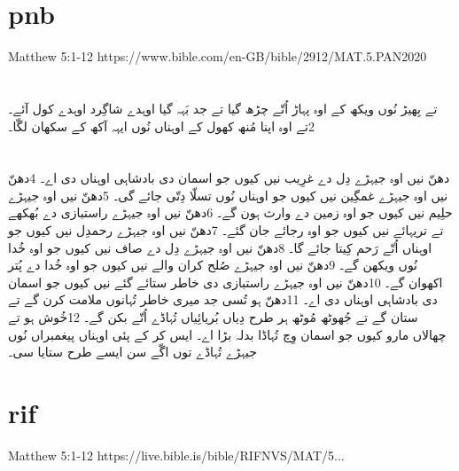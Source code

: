 \documentclass[12pt,fleqn,titlepage,twoside,a4paper]{book}
\begin{document}
\section{pnb}

Matthew 5:1-12 https://www.bible.com/en-GB/bible/2912/MAT.5.PAN2020

\begin{arab}[utf]
\section*{}

تے بِھیڑ نُوں ویکھ کے اوہ پہاڑ اُتّے چڑھ گیا تے جد بَہہ گیا اوہدے شاگِرد اوہدے کول آئے۔ 2تے اوہ اپنا مُنھ کھول کے اوہناں نُوں ایہہ آکھ کے سکھان لگّا۔

\section*{}

دھنّ نیں اوہ جیہڑے دِل دے غرِیب نیں
کیوں جو اسمان دی بادشاہی اوہناں دی اے۔
4دھنّ نیں اوہ جیہڑے غمگِین نیں
کیوں جو اوہناں نُوں تسلّا دِتّی جائے گی۔
5دھنّ نیں اوہ جیہڑے حلِیم نیں
کیوں جو اوہ زمین دے وارث ہون گے۔
6دھنّ نیں اوہ جیہڑے راستبازی دے بُھکھے تے تریہائے نیں
کیوں جو اوہ رجائے جان گئے۔
7دھنّ نیں اوہ جیہڑے رحمدِل نیں
کیوں جو اوہناں اُتّے رَحم کِیتا جائے گا۔
8دھنّ نیں اوہ جیہڑے دِل دے صاف نیں
کیوں جو اوہ خُدا نُوں ویکھن گے۔
9دھنّ نیں اوہ جیہڑے صُلح کران والے نیں
کیوں جو اوہ خُدا دے پُتر اکھوان گے۔
10دھنّ نیں اوہ جیہڑے راستبازی دی خاطر ستائے گئے نیں
کیوں جو اسمان دی بادشاہی اوہناں دی اے۔
11دھنّ ہو تُسی جد میری خاطر تُہانوں ملامت کرن گے تے ستان گے تے جُھوٹھ مُوٹھ ہر طرح دِیاں بُریائِیاں تُہاڈے اُتّے بکن گے۔ 12خُوش ہو تے چھالاں مارو کیوں جو اسمان وِچ تُہاڈا بدلہ بڑا اے۔ ایس کر کے پئی اوہناں پیغمبراں نُوں جیہڑے تُہاڈے توں اگّے سن ایسے طرح ستایا سی۔

\end{arab}

\section{rif}

Matthew 5:1-12 https://live.bible.is/bible/RIFNVS/MAT/5...
\end{document}
